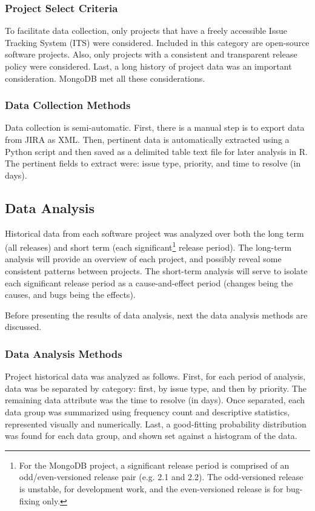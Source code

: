 \documentclass[a4paper]{scrartcl}
\begin{document}
\subsubsection{Project Select Criteria}
To facilitate data collection, only projects that have a freely accessible Issue Tracking System (ITS) were considered. Included in this category are open-source software projects. Also, only projects with a consistent and transparent release policy were considered. Last, a long history of project data was an important consideration. MongoDB met all these considerations.

\subsubsection{Data Collection Methods}
Data collection is semi-automatic. First, there is a manual step is to export data from JIRA as XML. Then, pertinent data is automatically extracted using a Python script and then saved as a delimited table text file for later analysis in R. The pertinent fields to extract were: issue type, priority, and time to resolve (in days).

\subsection{Data Analysis}
Historical data from each software project was analyzed over both the long term (all releases) and short term (each significant\footnote{For the MongoDB project, a significant release period is comprised of an odd/even-versioned release pair (e.g. 2.1 and 2.2). The odd-versioned release is unstable, for development work, and the even-versioned release is for bug-fixing only.} release period). The long-term analysis will provide an overview of each project, and possibly reveal some consistent patterns between projects. The short-term analysis will serve to isolate each significant release period as a cause-and-effect period (changes being the causes, and bugs being the effects).

Before presenting the results of data analysis, next the data analysis methods are discussed.

\subsubsection{Data Analysis Methods}
Project historical data was analyzed as follows. First, for each period of analysis, data was be separated by category: first, by issue type, and then by priority. The remaining data attribute was the time to resolve (in days). Once separated, each data group was summarized using frequency count and descriptive statistics, represented visually and numerically. Last, a good-fitting probability distribution was found for each data group, and shown set against a histogram of the data.
\end{document}

